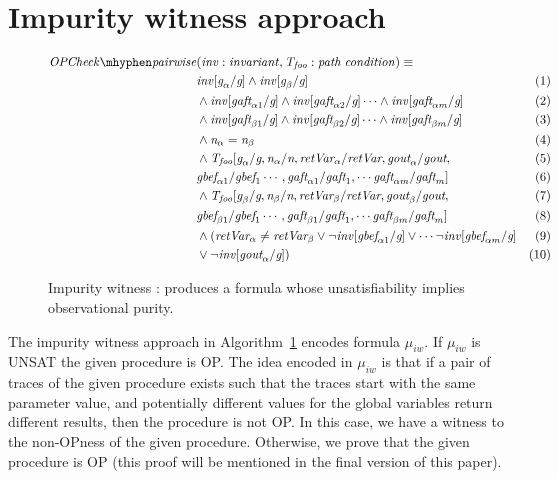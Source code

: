 \documentclass{llncs}
\newcommand{\foo}{\textit{foo}}
\newcommand{\inv}{\mathit{inv}}
\newcommand{\pathCondition}{\mathit{T_{\foo}}}
\newcommand{\OPCheckA}{\mathit{OPCheck \mhyphen pairwise}}
\newcommand{\mi}[1]{\mathit{#1}}
\newcommand{\retVar}{\textit{retVar}}
\newcommand{\n}{\textit{n}}
\newcommand{\g}{\textit{g}}
\newcommand{\gout}{\textit{gout}}
\newcommand{\gbef}{\textit{gbef}}
\newcommand{\gaft}{\textit{gaft}}
\newcommand{\formula}{\mu}
\begin{document}
\section{Impurity witness approach}\label{sec:impurityWitness}

\begin{figure}[htp]
  \begin{algorithm}[H]
    \begin{align*}
      \OPCheckA &\mi{(\inv : invariant,
        \pathCondition: path\; condition)} \equiv &\\
      &\inv[\g_\alpha/\g] \wedge \inv[\g_\beta/\g]  & (1)\\
      & \wedge \inv[\gaft_{\alpha1}/\g] \wedge
      \inv[\gaft_{\alpha2}/\g] \cdots \wedge \inv[\gaft_{\alpha m}/\g]
      & (2)\\
      & \wedge \inv[\gaft_{\beta1}/\g] \wedge \inv[\gaft_{\beta2}/\g]
      \cdots \wedge \inv[\gaft_{\beta m}/\g] & (3)\\
      &\wedge \n_\alpha = \n_\beta  & (4)\\
      &\wedge \pathCondition[\g_\alpha/\g, \n_\alpha/\n, \retVar_\alpha/\retVar,
        \gout_\alpha/\gout, & (5)\\
        &\gbef_{\alpha1}/\gbef_1 \cdots, \gaft_{\alpha 1}/\gaft_1, \cdots
        \gaft_{\alpha m}/\gaft_m]  & (6)\\
      &\wedge \pathCondition[\g_\beta/\g, \n_\beta/\n, \retVar_\beta/\retVar,
        \gout_\beta/\gout, & (7)\\
        &\gbef_{\beta1}/\gbef_1 \cdots, \gaft_{\beta 1}/\gaft_1, \cdots
        \gaft_{\beta m}/\gaft_m] & (8)\\
      &\wedge (\retVar_\alpha \neq \retVar_\beta \vee \neg\inv[\gbef_{\alpha1}/\g] \vee
       \cdots \neg\inv[\gbef_{\alpha m}/\g] & (9) \\
        &\vee \neg\inv[\gout_\alpha/\g])  & (10)\\
    \end{align*}
    \caption{Impurity witness : produces a formula whose unsatisfiability
    implies observational purity.}
    \label{algo:pairwiseOPcheckCombined}
  \end{algorithm}  
\end{figure}

The impurity witness approach in
Algorithm~\ref{algo:pairwiseOPcheckCombined} encodes formula
$\formula_{iw}$. If $\formula_{iw}$ is UNSAT the given procedure is
OP. The idea encoded in $\formula_{iw}$ is that if a pair of traces of
the given procedure exists such that the traces start with the same
parameter value, and potentially different values for the global
variables return different results, then the procedure is not OP. In
this case, we have a witness to the non-OPness of the given
procedure. Otherwise, we prove that the given procedure is OP (this
proof will be mentioned in the final version of this paper).
\end{document}
